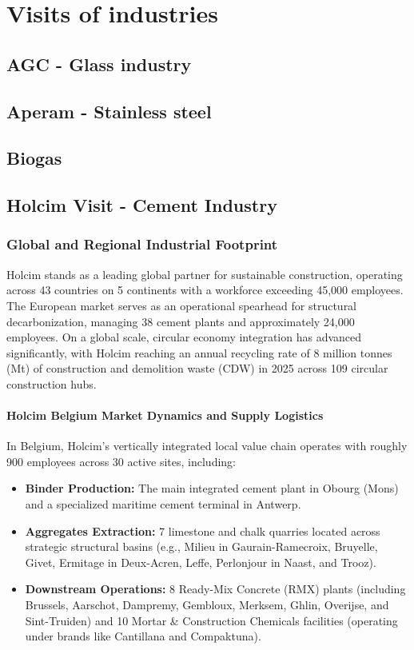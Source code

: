 \chapter{Visits of industries}

\section{AGC - Glass industry}

\section{Aperam - Stainless steel}

\section{Biogas}

\section{Holcim Visit - Cement Industry}

\subsection{Global and Regional Industrial Footprint}
Holcim stands as a leading global partner for sustainable construction, operating across 43 countries on 5 continents with a workforce exceeding 45,000 employees. The European market serves as an operational spearhead for structural decarbonization, managing 38 cement plants and approximately 24,000 employees. On a global scale, circular economy integration has advanced significantly, with Holcim reaching an annual recycling rate of \num{8} million tonnes (Mt) of construction and demolition waste (CDW) in 2025 across 109 circular construction hubs.

\subsubsection{Holcim Belgium Market Dynamics and Supply Logistics}
In Belgium, Holcim’s vertically integrated local value chain operates with roughly 900 employees across 30 active sites, including:
\begin{itemize}
    \item \textbf{Binder Production:} The main integrated cement plant in Obourg (Mons) and a specialized maritime cement terminal in Antwerp.
    \item \textbf{Aggregates Extraction:} 7 limestone and chalk quarries located across strategic structural basins (e.g., Milieu in Gaurain-Ramecroix, Bruyelle, Givet, Ermitage in Deux-Acren, Leffe, Perlonjour in Naast, and Trooz).
    \item \textbf{Downstream Operations:} 8 Ready-Mix Concrete (RMX) plants (including Brussels, Aarschot, Dampremy, Gembloux, Merksem, Ghlin, Overijse, and Sint-Truiden) and 10 Mortar \& Construction Chemicals facilities (operating under brands like Cantillana and Compaktuna).
\end{itemize}

